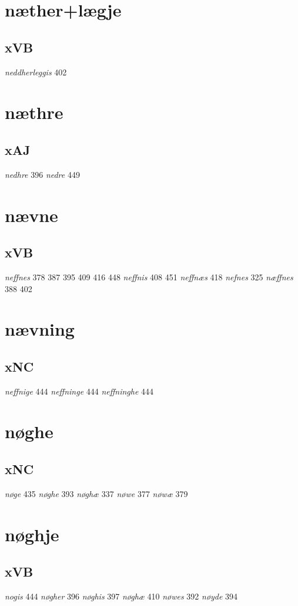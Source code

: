 \documentclass[a4paper,twocolumn]{article}
\begin{document}
\section{næther+lægje}
\label{sec:org618642c}
\subsection{xVB}
\label{sec:org31ce44d}
\emph{neddherleggis} 402 
\section{næthre}
\label{sec:org3a01d5a}
\subsection{xAJ}
\label{sec:org8d8694d}
\emph{nedhre} 396 \emph{nedre} 449 
\section{nævne}
\label{sec:org2751b03}
\subsection{xVB}
\label{sec:org08415d5}
\emph{neffnes} 378 387 395 409 416 448 \emph{neffnis} 408 451 \emph{neffnæs} 418 \emph{nefnes} 325 \emph{næffnes} 388 402 
\section{nævning}
\label{sec:org66db4b6}
\subsection{xNC}
\label{sec:org4cf78dc}
\emph{neffnige} 444 \emph{neffninge} 444 \emph{neffninghe} 444 
\section{nøghe}
\label{sec:org9653b6c}
\subsection{xNC}
\label{sec:org2be39cd}
\emph{nøge} 435 \emph{nøghe} 393 \emph{nøghæ} 337 \emph{nøwe} 377 \emph{nøwæ} 379 
\section{nøghje}
\label{sec:org8fef944}
\subsection{xVB}
\label{sec:org572b702}
\emph{nogis} 444 \emph{nøgher} 396 \emph{nøghis} 397 \emph{nøghæ} 410 \emph{nøwes} 392 \emph{nøyde} 394 
\end{document}
